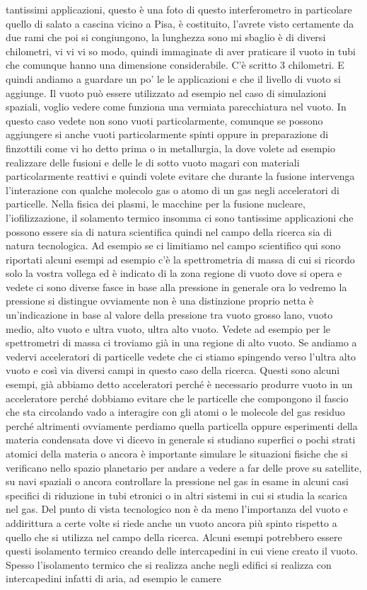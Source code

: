 tantissimi applicazioni, questo è una foto di questo interferometro in particolare quello di salato a cascina vicino a Pisa, è costituito, l'avrete visto certamente da due rami che poi si congiungono, la lunghezza sono mi sbaglio è di diversi chilometri, vi vi vi so modo, quindi immaginate di aver praticare il vuoto in tubi che comunque hanno una dimensione considerabile. C'è scritto 3 chilometri. E quindi andiamo a guardare un po' le le applicazioni e che il livello di vuoto si aggiunge. Il vuoto può essere utilizzato ad esempio nel caso di simulazioni spaziali, voglio vedere come funziona una vermiata parecchiatura nel vuoto. In questo caso vedete non sono vuoti particolarmente, comunque se possono aggiungere si anche vuoti particolarmente spinti oppure in preparazione di finzottili come vi ho detto prima o in metallurgia, la dove volete ad esempio realizzare delle fusioni e delle le di sotto vuoto magari con materiali particolarmente reattivi e quindi volete evitare che durante la fusione intervenga l'interazione con qualche molecolo gas o atomo di un gas negli acceleratori di particelle. Nella fisica dei plasmi, le macchine per la fusione nucleare, l'iofilizzazione, il solamento termico insomma ci sono tantissime applicazioni che possono essere sia di natura scientifica quindi nel campo della ricerca sia di natura tecnologica. Ad esempio se ci limitiamo nel campo scientifico qui sono riportati alcuni esempi ad esempio c'è la spettrometria di massa di cui si ricordo solo la vostra vollega ed è indicato di la zona regione di vuoto dove si opera e vedete ci sono diverse fasce in base alla pressione in generale ora lo vedremo la pressione si distingue ovviamente non è una distinzione proprio netta è un'indicazione in base al valore della pressione tra vuoto grosso lano, vuoto medio, alto vuoto e ultra vuoto, ultra alto vuoto. Vedete ad esempio per le spettrometri di massa ci troviamo già in una regione di alto vuoto. Se andiamo a vedervi acceleratori di particelle vedete che ci stiamo spingendo verso l'ultra alto vuoto e così via diversi campi in questo caso della ricerca. Questi sono alcuni esempi, già abbiamo detto acceleratori perché è necessario produrre vuoto in un acceleratore perché dobbiamo evitare che le particelle che compongono il fascio che sta circolando vado a interagire con gli atomi o le molecole del gas residuo perché altrimenti ovviamente perdiamo quella particella oppure esperimenti della materia condensata dove vi dicevo in generale si studiano superfici o pochi strati atomici della materia o ancora è importante simulare le situazioni fisiche che si verificano nello spazio planetario per andare a vedere a far delle prove su satellite, su navi spaziali o ancora controllare la pressione nel gas in esame in alcuni casi specifici di riduzione in tubi etronici o in altri sistemi in cui si studia la scarica nel gas. Del punto di vista tecnologico non è da meno l'importanza del vuoto e addirittura a certe volte si riede anche un vuoto ancora più spinto rispetto a quello che si utilizza nel campo della ricerca. Alcuni esempi potrebbero essere questi isolamento termico creando delle intercapedini in cui viene creato il vuoto. Spesso l'isolamento termico che si realizza anche negli edifici si realizza con intercapedini infatti di aria, ad esempio le camere 